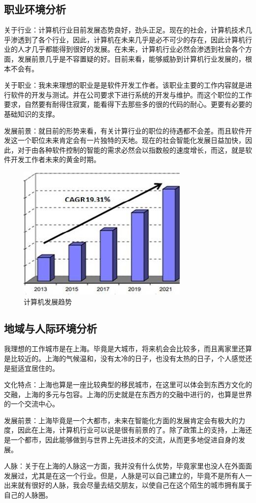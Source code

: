 \documentclass{article}
\begin{document}
\subsection{职业环境分析}
关于行业：计算机行业目前发展态势良好，劲头正足。现在的社会，计算机技术几乎渗透到了各个行业，因此，计算机在未来几乎是必不可少的存在，因此计算机行业的人才几乎都能得到很好的发展。在未来，计算机行业必然会渗透到社会各个方面，发展前景几乎是不容置疑的好。目前来看，能够威胁到计算机行业发展的，根本不会有。\par 
关于职业：我未来理想的职业是是软件开发工作者。该职业主要的工作内容就是进行软件的开发与测试。并在公司要求下进行系统的开发与维护。而这个职位的工作要求，自然要有耐得住寂寞，能看得下去那些多的很的代码的耐心。更要有必要的基础知识的支撑。\par 
发展前景：就目前的形势来看，有关计算行业的职位的待遇都不会差。而且软件开发这一个职位未来肯定会有一片独特的天地。现在的社会智能化发展日益加快，因此，对于由各种软件控制的智能的需求必然会以指数般的速度增长，而这，就是软件开发工作者未来的黄金时期。\par
\begin{figure}[H]
	\centering
	\includegraphics[scale=1.0]{jisuanjifazhanqushi}
	\caption{计算机发展趋势}
	\label{fig:jisuanjifazhanqushi}
\end{figure}

\subsection{地域与人际环境分析}
我理想的工作城市是在上海。毕竟是大城市，将来机会会比较多，而且离家里还算是比较近的。上海的气候温和，没有太冷的日子，也没有太热的日子，个人感觉还是挺适宜居住的。\par 
文化特点：上海也算是一座比较典型的移民城市，在这里可以体会到东西方文化的交融，上海的多元与包容。上海的历史就是在东西方的交融中进行的，也算是世界的一个交流中心。\par 
发展前景：上海毕竟是一个大都市，未来在智能化方面的发展肯定会有极大的力度，因此在上海，计算机行业可以说是很有前景的了。除了政策上的支持，上海还是一个都市，因此能够做到与世界上先进技术的交流，从而更多地促进自身的发展。\par 
人脉：关于在上海的人脉这一方面，我并没有什么优势，毕竟家里也没人在外面面发展过，尤其是在这一个行业。但是，人脉是可以自己建立的，毕竟不是所有人一出来就有很好的人脉，我会尽量去结交朋友，以使自己在这个陌生的城市拥有属于自己的人脉圈。\par
\par \par
\end{document}
